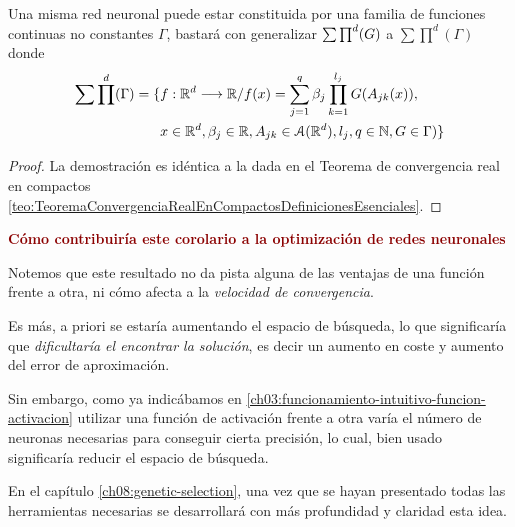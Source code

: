 \begin{aportacionOriginal}

\begin{corolario} 
    \label{cor:se-generaliza-G-a-una-familia}

    Una misma red neuronal puede estar constituida por una familia de funciones continuas no constantes $\Gamma$, 
    bastará con generalizar $\sum \prod^d (G)$ a $\sum \prod ^d (\Gamma)$ donde 
    \begin{equation}
        \begin{split}
            \sum \prod^d (\Gamma) = \{ 
                &f: \mathbb{R}^d \longrightarrow \mathbb{R} /
                f(x) = \sum_{j = 1} ^q  \beta_j \prod_{k=1}^{l_j}
                G(A_{jk}(x)), \\
                &x  \in \mathbb{R}^d, \beta_j \in \mathbb{R}, A_{jk}\in \mathcal{A}(\mathbb{R}^d), l_j,q \in \mathbb{N}, G \in \Gamma
                )
                \}
        \end{split}
    \end{equation}
\end{corolario}
\begin{proof}
    La demostración es idéntica a la dada en el Teorema de convergencia 
    real en compactos \ref{teo:TeoremaConvergenciaRealEnCompactosDefinicionesEsenciales}.
\end{proof}
\end{aportacionOriginal}

\iconoClave  \textcolor{darkRed}{ \textbf{Cómo contribuiría este corolario a la optimización de redes neuronales}}

Notemos que este resultado no da pista alguna de las ventajas de una función frente a otra,
ni cómo afecta a la \textit{velocidad de convergencia}.

Es más, a priori se estaría aumentando el espacio de búsqueda, lo que significaría que \textit{dificultaría el encontrar la solución}, es decir
un aumento en coste y aumento del error de aproximación.

Sin embargo, como ya indicábamos en 
\ref{ch03:funcionamiento-intuitivo-funcion-activacion}
utilizar una función de activación frente a otra
varía el número de neuronas necesarias para 
conseguir cierta precisión, lo cual,
bien usado  significaría
reducir el espacio de búsqueda.

En el capítulo \ref{ch08:genetic-selection}, una vez que 
se hayan presentado todas las herramientas necesarias 
se desarrollará con más profundidad y claridad esta idea.


